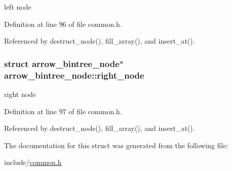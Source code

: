 left node 

Definition at line 96 of file common.h.

Referenced by destruct\_\-node(), fill\_\-array(), and insert\_\-at().\hypertarget{structarrow__bintree__node_4875801983f2b0220212951e6c0130af}{
\subsubsection{\setlength{\rightskip}{0pt plus 5cm}struct {\bf arrow\_\-bintree\_\-node}$\ast$ {\bf arrow\_\-bintree\_\-node::right\_\-node}}}
\label{structarrow__bintree__node_4875801983f2b0220212951e6c0130af}


right node 

Definition at line 97 of file common.h.

Referenced by destruct\_\-node(), fill\_\-array(), and insert\_\-at().

The documentation for this struct was generated from the following file:\begin{CompactItemize}
\item 
include/\hyperlink{common_8h}{common.h}\end{CompactItemize}
